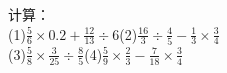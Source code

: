 
计算：\\
(1)$\frac{5}{6} \times 0.2+\frac{12}{13} \div 6$\hspace{12em}(2)$\frac{16}{3} \div \frac{4}{5}-\frac{1}{3} \times \frac{3}{4}$\hspace{12em}\\[6em]
(3)$\frac{5}{8} \times \frac{3}{25} \div \frac{8}{5}$\hspace{14em}(4)$\frac{5}{9} \times \frac{2}{3}-\frac{7}{18} \times \frac{3}{4}$\hspace{12em}\\[6em]
